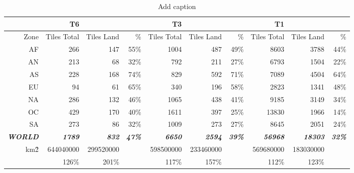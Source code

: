\begin{table}[htbp]
  \centering
  \caption{Add caption}
    \begin{tabular}{rrrrrrrrrr}
    \toprule
          & \textbf{T6} & \textbf{} & \textbf{} & \textbf{T3} & \textbf{} & \textbf{} & \textbf{T1} & \textbf{} & \textbf{} \\
    \midrule
    Zone  & Tiles Total & Tiles Land & \%    & Tiles Total & Tiles Land & \%    & Tiles Total & Tiles Land & \% \\
    AF    & 266   & 147   & 55\%  & 1004  & 487   & 49\%  & 8603  & 3788  & 44\% \\
    AN    & 213   & 68    & 32\%  & 792   & 211   & 27\%  & 6793  & 1504  & 22\% \\
    AS    & 228   & 168   & 74\%  & 829   & 592   & 71\%  & 7089  & 4504  & 64\% \\
    EU    & 94    & 61    & 65\%  & 340   & 196   & 58\%  & 2823  & 1341  & 48\% \\
    NA    & 286   & 132   & 46\%  & 1065  & 438   & 41\%  & 9185  & 3149  & 34\% \\
    OC    & 429   & 170   & 40\%  & 1611  & 397   & 25\%  & 13830 & 1966  & 14\% \\
    SA    & 273   & 86    & 32\%  & 1009  & 273   & 27\%  & 8645  & 2051  & 24\% \\
    \textit{\textbf{WORLD}} & \textit{\textbf{1789}} & \textit{\textbf{832}} & \textit{\textbf{47\%}} & \textit{\textbf{6650}} & \textit{\textbf{2594}} & \textit{\textbf{39\%}} & \textit{\textbf{56968}} & \textit{\textbf{18303}} & \textit{\textbf{32\%}} \\
    km\^2 & 644040000 & 299520000 &       & 598500000 & 233460000 &       & 569680000 & 183030000 &  \\
          & 126\% & 201\% &       & 117\% & 157\% &       & 112\% & 123\% &  \\
    \bottomrule
    \end{tabular}%
  \label{tab:addlabel}%
\end{table}%
